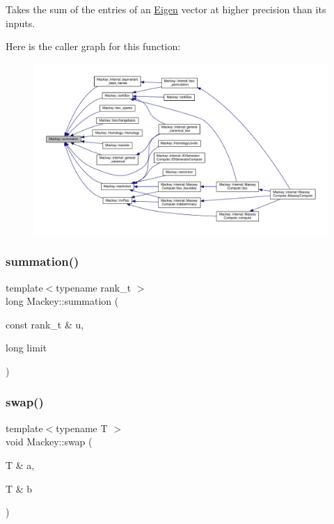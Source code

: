 Takes the sum of the entries of an \hyperlink{namespaceEigen}{Eigen} vector at higher precision than its inputs. 

Here is the caller graph for this function\+:\nopagebreak
\begin{figure}[H]
\begin{center}
\leavevmode
\includegraphics[width=350pt]{namespaceMackey_a654ed2652808daa206cdaa7ac0fce0e1_icgraph}
\end{center}
\end{figure}
\mbox{\label{namespaceMackey_adf2e9770c170152b22ca8125f96df8d1}} 
\subsubsection{\texorpdfstring{summation()}{summation()}\hspace{0.1cm}{\footnotesize\ttfamily [2/2]}}
{\footnotesize\ttfamily template$<$typename rank\+\_\+t $>$ \\
long Mackey\+::summation (\begin{DoxyParamCaption}\item[{const rank\+\_\+t \&}]{u,  }\item[{long}]{limit }\end{DoxyParamCaption})}

\mbox{\label{namespaceMackey_aabed38680919594c4ba5eaa6730a7f82}} 
\subsubsection{\texorpdfstring{swap()}{swap()}}
{\footnotesize\ttfamily template$<$typename T $>$ \\
void Mackey\+::swap (\begin{DoxyParamCaption}\item[{T \&}]{a,  }\item[{T \&}]{b }\end{DoxyParamCaption})}

